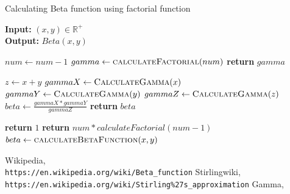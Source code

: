 \documentclass[12pt]{report}
\begin{document}
\begin{algorithm}
\caption{Calculating Beta function using factorial function}

\textbf{Input:}  $ (x,y) \in \mathbb{R}^{+}$\\
\textbf{Output:} $ Beta(x,y)$
\begin{algorithmic}[1]

    \State $num \leftarrow num-1$
    \State $gamma \leftarrow \Call{calculateFactorial}{num}$
    \State \textbf{return} $gamma$
    \EndProcedure
\Statex

    \State $z \leftarrow x+y$
    \State $gammaX  \leftarrow \Call{CalculateGamma}{x}$
    \State $gammaY \leftarrow \Call{CalculateGamma}{y}$
    \State $gammaZ \leftarrow \Call{CalculateGamma}{z}$
    \State $beta \leftarrow \frac{gammaX *gammaY}{gammaZ}$
    \State \textbf{return} $beta$
    \EndProcedure
\Statex

   
    \State \textbf{return} $1$
    \Else
    \State \textbf{return} $num * calculateFactorial(num - 1)$
    \EndIf
    \EndProcedure
\Statex
\State $beta \leftarrow \Call{calculateBetaFunction}{x,y} $
\end{algorithmic}
\end{algorithm}

\newpage
\begin{thebibliography}{9}

Wikipedia,
\\\texttt{https://en.wikipedia.org/wiki/Beta\_function}
Stirlingwiki,
\\\texttt{https://en.wikipedia.org/wiki/Stirling\%27s\_approximation}
Gamma,
\\


\end{thebibliography}
\end{document}
